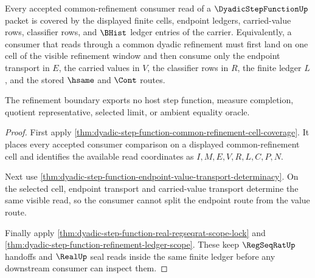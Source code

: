 \begin{theorem}
\label{thm:dyadic-step-function-refinement-boundary-coverage}
Every accepted common-refinement consumer read of a $\DyadicStepFunctionUp$ packet is covered by the displayed finite cells, endpoint ledgers, carried-value rows, classifier rows, and $\BHist$ ledger entries of the carrier. Equivalently, a consumer that reads through a common dyadic refinement must first land on one cell of the visible refinement window and then consume only the endpoint transport in $E$, the carried values in $V$, the classifier rows in $R$, the finite ledger $L$, and the stored $\hsame$ and $\Cont$ routes.

The refinement boundary exports no host step function, measure completion, quotient representative, selected limit, or ambient equality oracle.
\end{theorem}
\begin{proof}
First apply \autoref{thm:dyadic-step-function-common-refinement-cell-coverage}. It places every accepted consumer comparison on a displayed common-refinement cell and identifies the available read coordinates as $I,M,E,V,R,L,C,P,N$.

Next use \autoref{thm:dyadic-step-function-endpoint-value-transport-determinacy}. On the selected cell, endpoint transport and carried-value transport determine the same visible read, so the consumer cannot split the endpoint route from the value route.

Finally apply \autoref{thm:dyadic-step-function-real-regseqrat-scope-lock} and \autoref{thm:dyadic-step-function-refinement-ledger-scope}. These keep $\RegSeqRatUp$ handoffs and $\RealUp$ seal reads inside the same finite ledger before any downstream consumer can inspect them.
\end{proof}

